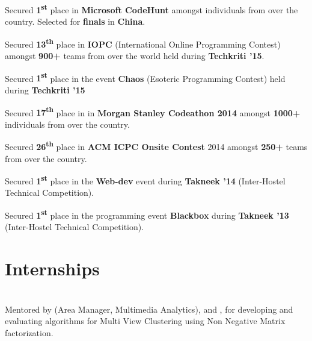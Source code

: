 \documentclass[a4paper]{norm-resume} %
\begin{document}
\begin{tightitemize}
	\item Secured \textbf{1\textsuperscript{st}} place in \textbf{Microsoft CodeHunt} amongst individuals from over the country. Selected for \textbf{finals} in \textbf{China}.
	\item Secured \textbf{13\textsuperscript{th}} place in \textbf{IOPC} (International Online Programming Contest) amongst \textbf{900+} teams from over the world held during \textbf{Techkriti '15}.
	\item Secured \textbf{1\textsuperscript{st}} place in the event \textbf{Chaos} (Esoteric Programming Contest) held during \textbf{Techkriti '15}
	\item Secured \textbf{17\textsuperscript{th}} place in in \textbf{Morgan Stanley Codeathon 2014} amongst \textbf{1000+} individuals from over the country.
	\item Secured \textbf{26\textsuperscript{th}} place in \textbf{ACM ICPC Onsite Contest} 2014 amongst \textbf{250+} teams from over the country.
	\item Secured \textbf{1\textsuperscript{st}} place in the \textbf{Web-dev} event during \textbf{Takneek '14} (Inter-Hostel Technical Competition).
	\item Secured \textbf{1\textsuperscript{st}} place in the programming event \textbf{Blackbox} during \textbf{Takneek '13} (Inter-Hostel Technical Competition).
\end{tightitemize}

\vspace{0mm}	%


\section{Internships}

\vspace{2mm} %
		
				

\vspace{-1mm} %

	\begin{changemargin}{1.0cm}{0.0cm} 
	{
	\large{}  \\
	\small{Mentored by  (Area Manager, Multimedia Analytics),  and , for developing and evaluating algorithms for Multi View Clustering using Non Negative Matrix factorization.} 		
	}
	\end{changemargin} 	
	
\end{document}
